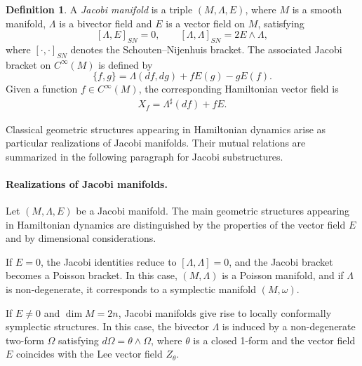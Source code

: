 \documentclass{article}
\theoremstyle{remark}
\theoremstyle{definition}
\newtheorem{definition}{Definition}[section]
\begin{document}
\begin{definition}\label{def:jac}
A \emph{Jacobi manifold} is a triple $(M,\Lambda,E)$, where $M$ is a smooth
manifold, $\Lambda$ is a bivector field and $E$ is a vector field on $M$,
satisfying
\[
[\Lambda,E]_{SN}=0,
\qquad
[\Lambda,\Lambda]_{SN}=2E\wedge\Lambda,
\]
where $[\cdot,\cdot]_{SN}$ denotes the Schouten--Nijenhuis bracket. The associated
Jacobi bracket on $C^\infty(M)$ is defined by
\[
\{f,g\}=\Lambda(df,dg)+fE(g)-gE(f).
\]
Given a function $f\in C^\infty(M)$, the corresponding Hamiltonian vector field is
\begin{align}\label{Ha} X_f=\Lambda^\sharp(df)+fE. 
\end{align}
\end{definition}
Classical geometric structures appearing in Hamiltonian dynamics arise as
particular realizations of Jacobi manifolds. Their mutual relations are summarized in the following paragraph for Jacobi substructures.
\begin{center}
\end{center}

\paragraph{Realizations of Jacobi manifolds.}
Let $(M,\Lambda,E)$ be a Jacobi manifold. The main geometric structures appearing
in Hamiltonian dynamics are distinguished by the properties of the vector field
$E$ and by dimensional considerations.

If $E=0$, the Jacobi identities reduce to $[\Lambda,\Lambda]=0$, and the Jacobi
bracket becomes a Poisson bracket. In this case, $(M,\Lambda)$ is a Poisson
manifold, and if $\Lambda$ is non-degenerate, it corresponds to a symplectic
manifold $(M,\omega)$.

If $E\neq 0$ and $\dim M=2n$, Jacobi manifolds give rise to locally conformally
symplectic structures. In this case, the bivector $\Lambda$ is induced by a
non-degenerate two-form $\Omega$ satisfying $d\Omega=\theta\wedge\Omega$, where $\theta$ is a closed 1-form and the
vector field $E$ coincides with the Lee vector field $Z_\theta$.
\end{document}
